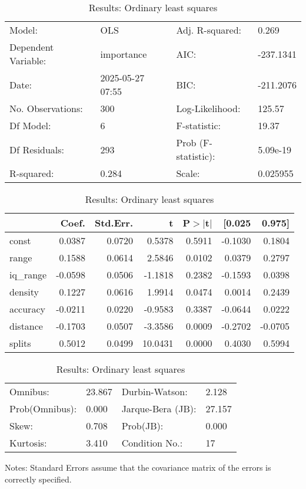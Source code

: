 \begin{table}
\caption{Results: Ordinary least squares}
\label{}
\begin{center}
\begin{tabular}{llll}
\hline
Model:              & OLS              & Adj. R-squared:     & 0.269      \\
Dependent Variable: & importance       & AIC:                & -237.1341  \\
Date:               & 2025-05-27 07:55 & BIC:                & -211.2076  \\
No. Observations:   & 300              & Log-Likelihood:     & 125.57     \\
Df Model:           & 6                & F-statistic:        & 19.37      \\
Df Residuals:       & 293              & Prob (F-statistic): & 5.09e-19   \\
R-squared:          & 0.284            & Scale:              & 0.025955   \\
\hline
\end{tabular}
\end{center}

\begin{center}
\begin{tabular}{lrrrrrr}
\hline
          &   Coef. & Std.Err. &       t & P$> |$t$|$ &  [0.025 &  0.975]  \\
\hline
const     &  0.0387 &   0.0720 &  0.5378 &      0.5911 & -0.1030 &  0.1804  \\
range     &  0.1588 &   0.0614 &  2.5846 &      0.0102 &  0.0379 &  0.2797  \\
iq\_range & -0.0598 &   0.0506 & -1.1818 &      0.2382 & -0.1593 &  0.0398  \\
density   &  0.1227 &   0.0616 &  1.9914 &      0.0474 &  0.0014 &  0.2439  \\
accuracy  & -0.0211 &   0.0220 & -0.9583 &      0.3387 & -0.0644 &  0.0222  \\
distance  & -0.1703 &   0.0507 & -3.3586 &      0.0009 & -0.2702 & -0.0705  \\
splits    &  0.5012 &   0.0499 & 10.0431 &      0.0000 &  0.4030 &  0.5994  \\
\hline
\end{tabular}
\end{center}

\begin{center}
\begin{tabular}{llll}
\hline
Omnibus:       & 23.867 & Durbin-Watson:    & 2.128   \\
Prob(Omnibus): & 0.000  & Jarque-Bera (JB): & 27.157  \\
Skew:          & 0.708  & Prob(JB):         & 0.000   \\
Kurtosis:      & 3.410  & Condition No.:    & 17      \\
\hline
\end{tabular}
\end{center}
\end{table}
\bigskip
Notes: \newline 
[1] Standard Errors assume that the covariance matrix of the errors is correctly specified.